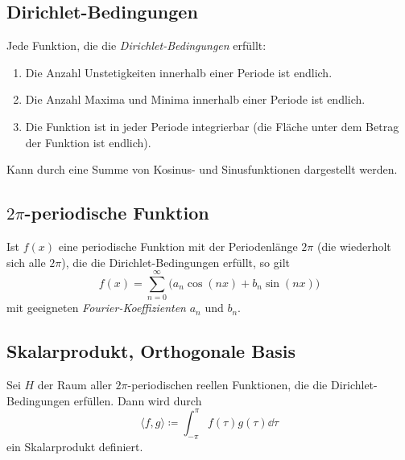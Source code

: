 		\subsection{Dirichlet-Bedingungen}
			Jede Funktion, die die \emph{Dirichlet-Bedingungen} erfüllt:
			\begin{enumerate}
				\item Die Anzahl Unstetigkeiten innerhalb einer Periode ist endlich.
				\item Die Anzahl Maxima und Minima innerhalb einer Periode ist endlich.
				\item Die Funktion ist in jeder Periode integrierbar (\dh die Fläche unter dem Betrag der Funktion ist endlich).
			\end{enumerate}
			Kann durch eine Summe von Kosinus- und Sinusfunktionen dargestellt werden.

		\subsection{\(2\pi\)-periodische Funktion}
			Ist \( f(x) \) eine periodische Funktion mit der Periodenlänge \( 2\pi \) (\dh die wiederholt sich alle \(2\pi\)), die die Dirichlet-Bedingungen erfüllt, so gilt
			\begin{equation*}
				f(x) = \sum_{n = 0}^{\infty} \big( a_n \cos(nx) + b_n \sin(nx) \big)
			\end{equation*}
			mit geeigneten \emph{Fourier-Koeffizienten} \( a_n \) und \( b_n \).

		\subsection{Skalarprodukt, Orthogonale Basis}
			Sei \(H\) der Raum aller \(2\pi\)-periodischen reellen Funktionen, die die Dirichlet-Bedingungen erfüllen. Dann wird durch
			\begin{equation*}
				\langle f, g \rangle \coloneqq \int_{-\pi}^{\pi} \! f(\tau) g(\tau) \dd{\tau}
			\end{equation*}
			ein Skalarprodukt definiert.

